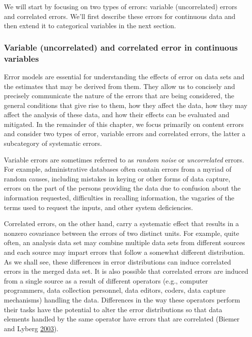 \documentclass[]{krantz}
\begin{document}
We will start by focusing on two types of errors: variable
(uncorrelated) errors and correlated errors. We'll first describe these
errors for continuous data and then extend it to categorical variables
in the next section.

\hypertarget{sec:10-4.2.1}{\subsubsection{Variable (uncorrelated) and
correlated error in continuous variables}\label{sec:10-4.2.1}}

Error models are essential for understanding the effects of error on
data sets and the estimates that may be derived from them. They allow us
to concisely and precisely communicate the nature of the errors that are
being considered, the general conditions that give rise to them, how
they affect the data, how they may affect the analysis of these data,
and how their effects can be evaluated and mitigated. In the remainder
of this chapter, we focus primarily on content errors and consider two
types of error, variable errors and correlated errors, the latter a
subcategory of systematic errors.

Variable errors are sometimes referred to as \emph{random noise} or
\emph{uncorrelated} errors. For example, administrative databases often
contain errors from a myriad of random causes, including mistakes in
keying or other forms of data capture, errors on the part of the persons
providing the data due to confusion about the information requested,
difficulties in recalling information, the vagaries of the terms used to
request the inputs, and other system deficiencies.

Correlated errors, on the other hand, carry a systematic effect that
results in a nonzero covariance between the errors of two distinct
units. For example, quite often, an analysis data set may combine
multiple data sets from different sources and each source may impart
errors that follow a somewhat different distribution. As we shall see,
these differences in error distributions can induce correlated errors in
the merged data set. It is also possible that correlated errors are
induced from a single source as a result of different operators (e.g.,
computer programmers, data collection personnel, data editors, coders,
data capture mechanisms) handling the data. Differences in the way these
operators perform their tasks have the potential to alter the error
distributions so that data elements handled by the same operator have
errors that are correlated (Biemer and Lyberg
\protect\hyperlink{ref-biemer2003}{2003}).
\end{document}
